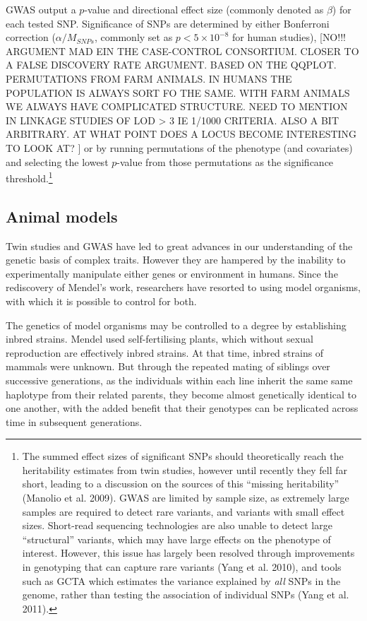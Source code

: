 \documentclass[
]{book}
\begin{document}
GWAS output a \(p\)-value and directional effect size (commonly denoted as \(\beta\)) for each tested SNP. Significance of SNPs are determined by either Bonferroni correction (\(\alpha / M_{SNPs}\), commonly set as \(p < 5 \times 10^{-8}\) for human studies), {[}NO!!! ARGUMENT MAD EIN THE CASE-CONTROL CONSORTIUM. CLOSER TO A FALSE DISCOVERY RATE ARGUMENT. BASED ON THE QQPLOT. PERMUTATIONS FROM FARM ANIMALS. IN HUMANS THE POPULATION IS ALWAYS SORT FO THE SAME. WITH FARM ANIMALS WE ALWAYS HAVE COMPLICATED STRUCTURE. NEED TO MENTION IN LINKAGE STUDIES OF LOD \textgreater{} 3 IE 1/1000 CRITERIA. ALSO A BIT ARBITRARY. AT WHAT POINT DOES A LOCUS BECOME INTERESTING TO LOOK AT? {]} or by running permutations of the phenotype (and covariates) and selecting the lowest \(p\)-value from those permutations as the significance threshold.\footnote{The summed effect sizes of significant SNPs should theoretically reach the heritability estimates from twin studies, however until recently they fell far short, leading to a discussion on the sources of this ``missing heritability'' (Manolio et al. 2009). GWAS are limited by sample size, as extremely large samples are required to detect rare variants, and variants with small effect sizes. Short-read sequencing technologies are also unable to detect large ``structural'' variants, which may have large effects on the phenotype of interest. However, this issue has largely been resolved through improvements in genotyping that can capture rare variants (Yang et al. 2010), and tools such as GCTA which estimates the variance explained by \emph{all} SNPs in the genome, rather than testing the association of individual SNPs (Yang et al. 2011).}

\hypertarget{animal-models}{%
\subsection{Animal models}\label{animal-models}}

Twin studies and GWAS have led to great advances in our understanding of the genetic basis of complex traits. However they are hampered by the inability to experimentally manipulate either genes or environment in humans. Since the rediscovery of Mendel's work, researchers have resorted to using model organisms, with which it is possible to control for both.

The genetics of model organisms may be controlled to a degree by establishing inbred strains. Mendel used self-fertilising plants, which without sexual reproduction are effectively inbred strains. At that time, inbred strains of mammals were unknown. But through the repeated mating of siblings over successive generations, as the individuals within each line inherit the same same haplotype from their related parents, they become almost genetically identical to one another, with the added benefit that their genotypes can be replicated across time in subsequent generations.
\end{document}
